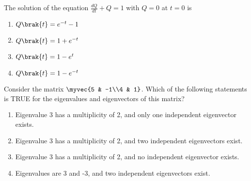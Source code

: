  
\item The solution of the equation $\frac{dQ}{dt} + Q = 1$ with $Q = 0$ at $t=0$ is
\begin{multicols}{2}
    \begin{enumerate}
        \item $Q\brak{t} = e^{-t} - 1$
        \item $Q\brak{t} = 1 + e^{-t}$
        \item $Q\brak{t} = 1 - e^{t}$
        \item $Q\brak{t} = 1 - e^{-t}$
    \end{enumerate}
\end{multicols}

\item Consider the matrix $\myvec{5 & -1\\4 & 1}$. Which of the following statements is TRUE for the eigenvalues and eigenvectors of this matrix?
\begin{multicols}{2}
    \begin{enumerate}
        \item Eigenvalue 3 has a multiplicity of 2, and only one independent eigenvector exists.
        \item Eigenvalue 3 has a multiplicity of 2, and two independent eigenvectors exist.
        \item Eigenvalue 3 has a multiplicity of 2, and no independent eigenvector exists.
        \item Eigenvalues are 3 and -3, and two independent eigenvectors exist.
    \end{enumerate}
\end{multicols}
    
